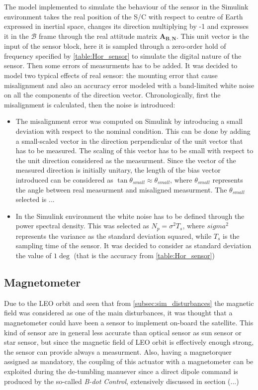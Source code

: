 The model implemented to simulate the behaviour of the sensor in the Simulink environment 
takes the real position of the S/C with respect to centre of Earth expressed in inertial space, changes its
direction multiplying by -1 and expresses it in the $\mathcal{B}$ frame through the real attitude matrix $\boldsymbol{A_{B,N}}$. 
This unit vector is the input of the sensor block, here it is sampled through a zero-order hold of frequency specified by
\autoref{table:Hor_sensor} to simulate the digital nature of the sensor. Then some errors of measurments has to be added.
It was decided to model two typical effects of real sensor: the mounting error that cause misalignment and also an 
accuracy error modeled with a band-limited white noise on all the components of the direction vector. 
Chronologically, first the misalignment is calculated, then the noise is introduced:
\begin{itemize}
    \item The misalignment error was computed on Simulink by introducing a small deviation with respect to the nominal condition. This can
    be done by adding a small-scaled vector in the direction perpendicular of the unit vector that has to be measured. The scaling of 
    this vector has to be small with respect to the unit direction considered as the measurment. Since the vector of the measured 
    direction is initially unitary, the length of the bias vector introduced can be considered as $\tan{\theta_{small}} \approx \theta_{small}$,
    where $\theta_{small}$ represents the angle between real measurment and misaligned measurment. The $\theta_{small}$ selected is ... 
    \item In the Simulink environment the white noise has to be defined through the power spectral density. This was selected as $N_p = \sigma^2 {T_s} $, 
    where $sigma^2$ represents the variance as the standard deviation squared, while $T_s$ is the sampling time of the sensor.
    It was decided to consider as standard deviation the value of $1\deg$ (that is the accuracy from \autoref{table:Hor_sensor})
\end{itemize}


\subsection{Magnetometer}
Due to the LEO orbit and seen that from \autoref{subsec:sim_disturbances} the magnetic field  was considered as one of the main disturbances, 
it was thought that a magnetometer could have been a sensor to implement on-board the satellite. This kind of sensor are in general less accurate 
than optical sensor as sun sensor or star sensor, but since the magnetic field of LEO orbit is effectively enough strong, the sensor can provide 
always a measurment. Also, having a magnetorquer assigned as mandatory, the coupling of this actuator with a magnetometer can be exploited during 
the de-tumbling manuever since a direct dipole command is produced by the so-called \textit{B-dot Control}, extensively discussed in section (...)

